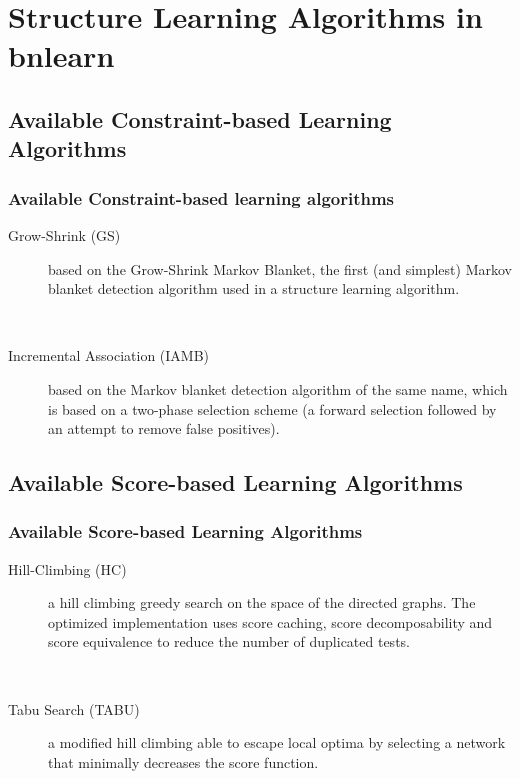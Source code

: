 \documentclass{beamer}
\begin{document}
\section{Structure Learning Algorithms in bnlearn}
\subsection{Available Constraint-based Learning Algorithms}
\begin{frame}
\frametitle{Available Constraint-based learning algorithms}
{\scriptsize{}
\begin{description}
\item[Grow-Shrink (GS)] based on the Grow-Shrink Markov Blanket, the first (and simplest) Markov blanket detection algorithm used in a structure learning algorithm.

{}\

\item[Incremental Association (IAMB)] based on the Markov blanket detection algorithm of the same name, which is based on a two-phase selection scheme (a forward selection followed by an attempt to remove false positives).
\end{description}
}
\end{frame}


\subsection{Available Score-based Learning Algorithms}
\begin{frame}
\frametitle{Available Score-based Learning Algorithms}
{\scriptsize{}
\begin{description}
\item[Hill-Climbing (HC)] a hill climbing greedy search on the space of the directed graphs. The optimized implementation uses score caching, score decomposability and score equivalence to reduce the number of duplicated tests.

{}\

\item[Tabu Search (TABU)] a modified hill climbing able to escape local optima by selecting a network that minimally decreases the score function.
\end{description}
}
\end{frame}
\end{document}
